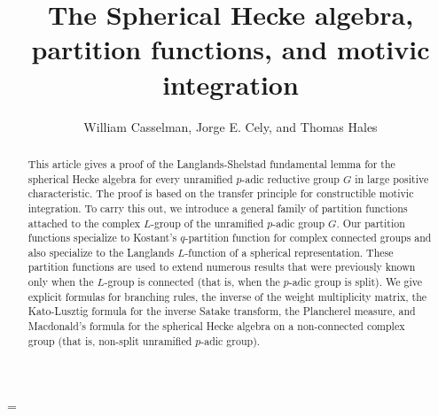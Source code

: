\documentclass{amsart}
\theoremstyle{plain}
\theoremstyle{definition}
\theoremstyle{remark}
\numberwithin{equation}{subsection}
\begin{document}
\title
    {The Spherical Hecke algebra, partition functions, and motivic integration}
\author{William Casselman, Jorge E. Cely, and Thomas Hales}


\begin{abstract}   
This article gives a proof of the Langlands-Shelstad fundamental 
lemma for the spherical Hecke algebra
for every unramified $p$-adic reductive group $G$ in large positive 
characteristic.  The proof is based on the transfer principle
for constructible motivic integration.    To carry this out,
we introduce a general family of partition functions attached to 
the complex $L$-group of the unramified $p$-adic group $G$.
Our partition functions specialize to Kostant's $q$-partition 
function for complex connected groups and also 
specialize to the Langlands $L$-function of a spherical representation.
These partition functions are used to extend numerous 
results that were previously known only when the $L$-group is
connected (that is, when the $p$-adic group is split).
We give explicit formulas for branching rules, the inverse of the weight multiplicity matrix,
the Kato-Lusztig formula for the inverse Satake transform,
the Plancherel measure,  and Macdonald's formula for the spherical Hecke algebra on a
non-connected complex group (that is, non-split unramified $p$-adic group).  
% 
\end{abstract}


\parskip=\baselineskip

 \maketitle



    

      
      
       
      
      
\end{document}
